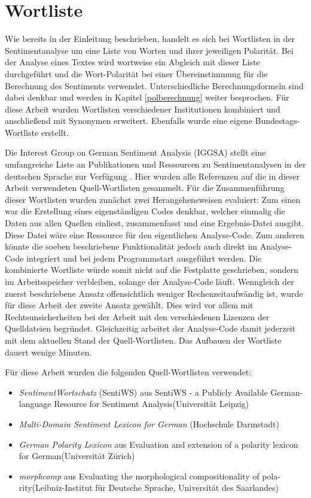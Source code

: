 \section{Wortliste}
\label{wortliste}
Wie bereits in der Einleitung beschrieben, handelt es sich bei Wortlisten in der Sentimentanalyse um eine Liste von Worten und ihrer jeweiligen Polarität. 
Bei der Analyse eines Textes wird wortweise ein Abgleich mit dieser Liste durchgeführt und die Wort-Polarität bei einer Übereinstimmung für die Berechnung des Sentiments verwendet. 
Unterschiedliche Berechnungsformeln sind dabei denkbar und werden in Kapitel \ref{polberechnung} weiter besprochen. 
Für diese Arbeit wurden Wortlisten verschiedener Institutionen kombiniert und anschließend mit Synonymen erweitert. 
Ebenfalls wurde eine eigene Bundestags-Wortliste erstellt. 

Die Interest Group on German Sentiment Analysis (IGGSA) stellt eine umfangreiche Liste an Publikationen und Ressourcen zu Sentimentanalysen in der deutschen Sprache zur Verfügung \cite{g3_iggsa}. 
Hier wurden alle Referenzen auf die in dieser Arbeit verwendeten Quell-Wortlisten gesammelt. 
Für die Zusammenführung dieser Wortlisten wurden zunächst zwei Herangehensweisen evaluiert: 
Zum einen war die Erstellung eines eigenständigen Codes denkbar, welcher einmalig die Daten aus allen Quellen einliest, zusammenfasst und eine Ergebnis-Datei ausgibt. 
Diese Datei wäre eine Ressource für den eigentlichen Analyse-Code. 
Zum anderen könnte die soeben beschriebene Funktionalität jedoch auch direkt im Analyse-Code integriert und bei jedem Programmstart ausgeführt werden. 
Die kombinierte Wortliste würde somit nicht auf die Festplatte geschrieben, sondern im Arbeitsspeicher verbleiben, solange der Analyse-Code läuft. 
Wenngleich der zuerst beschriebene Ansatz offensichtlich weniger Rechenzeitaufwändig ist, wurde für diese Arbeit der zweite Ansatz gewählt. 
Dies wird vor allem mit Rechtsunsicherheiten bei der Arbeit mit den verschiedenen Lizenzen der Quelldateien begründet. 
Gleichzeitig arbeitet der Analyse-Code damit jederzeit mit dem aktuellen Stand der Quell-Wortlisten. 
Das Aufbauen der Wortliste dauert wenige Minuten. 

Für diese Arbeit wurden die folgenden Quell-Wortlisten verwendet: 

\begin{itemize}
\item \textit{SentimentWortschatz} (SentiWS) aus \glqq SentiWS - a Publicly Available German-language Resource for Sentiment Analysis\grqq (Universität Leipzig) \cite{g3_sentiws}
\item \textit{Multi-Domain Sentiment Lexicon for German} (Hochschule Darmstadt) \cite{g3_opm}
\item \textit{German Polarity Lexicon} aus \glqq Evaluation and extension of a polarity lexicon for German\grqq (Universität Zürich) \cite{g3_polcla}
\item \textit{morphcomp} aus \glqq Evaluating the morphological compositionality of pola-rity\grqq (Leibniz-Institut für Deutsche Sprache, Universität des Saarlandes) \cite{g3_morphcomp}
\end{itemize}

